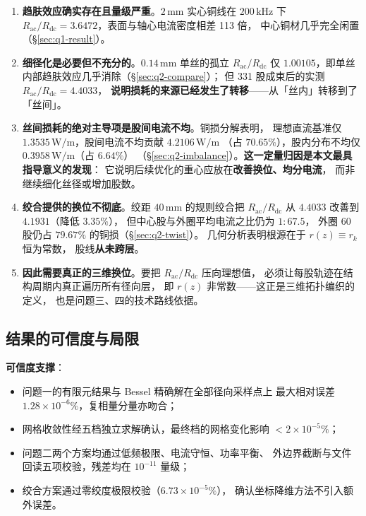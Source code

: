 \documentclass[12pt, a4paper]{ctexart}
\newcommand{\Rac}{R_{\mathrm{ac}}}
\newcommand{\Rdc}{R_{\mathrm{dc}}}
\newcommand{\U}[1]{\ensuremath{\,\mathrm{#1}}}
\begin{document}
\begin{enumerate}[label=\textbf{证据\arabic*}, leftmargin=4.4em, itemsep=4pt]
\item \textbf{趋肤效应确实存在且量级严重}。$2\U{mm}$ 实心铜线在
$200\U{kHz}$ 下 $\Rac/\Rdc = 3.6472$，表面与轴心电流密度相差 113 倍，
中心铜材几乎完全闲置（\S\ref{sec:q1-result}）。
\item \textbf{细径化是必要但不充分的}。$0.14\U{mm}$ 单丝的孤立
$\Rac/\Rdc$ 仅 $1.00105$，即单丝内部趋肤效应几乎消除（\S\ref{sec:q2-compare}）；
但 331 股成束后的实测 $\Rac/\Rdc = 4.4033$，
\textbf{说明损耗的来源已经发生了转移}——从「丝内」转移到了「丝间」。
\item \textbf{丝间损耗的绝对主导项是股间电流不均}。铜损分解表明，
理想直流基准仅 $1.3535\U{W/m}$，股间电流不均贡献 $4.2106\U{W/m}$
（占 $70.65\%$），股内分布不均仅 $0.3958\U{W/m}$（占 $6.64\%$）
（\S\ref{sec:q2-imbalance}）。\textbf{这一定量归因是本文最具指导意义的发现}：
它说明后续优化的重心应放在\textbf{改善换位、均分电流}，
而非继续细化丝径或增加股数。
\item \textbf{绞合提供的换位不彻底}。绞距 $40\U{mm}$ 的规则绞合把
$\Rac/\Rdc$ 从 $4.4033$ 改善到 $4.1931$（降低 $3.35\%$），
但中心股与外圈平均电流之比仍为 $1:67.5$，
外圈 60 股仍占 $79.67\%$ 的铜损（\S\ref{sec:q2-twist}）。
几何分析表明根源在于 $r(z) \equiv r_k$ 恒为常数，
股线\textbf{从未跨层}。
\item \textbf{因此需要真正的三维换位}。要把 $\Rac/\Rdc$ 压向理想值，
必须让每股轨迹在结构周期内真正遍历所有径向层，
即 $r(z)$ 非常数——这正是三维拓扑编织的定义，
也是问题三、四的技术路线依据。
\end{enumerate}

\subsection{结果的可信度与局限}

\textbf{可信度支撑}：

\begin{itemize}[leftmargin=2em, itemsep=2pt]
\item 问题一的有限元结果与 Bessel 精确解在全部径向采样点上
最大相对误差 $1.28\times10^{-6}\%$，复相量分量亦吻合；
\item 网格收敛性经五档独立求解确认，最终档的网格变化影响 $<2\times10^{-5}\%$；
\item 问题二两个方案均通过低频极限、电流守恒、功率平衡、
外边界截断与文件回读五项校验，残差均在 $10^{-11}$ 量级；
\item 绞合方案通过零绞度极限校验（$6.73\times10^{-5}\%$），
确认坐标降维方法不引入额外误差。
\end{itemize}
\end{document}
